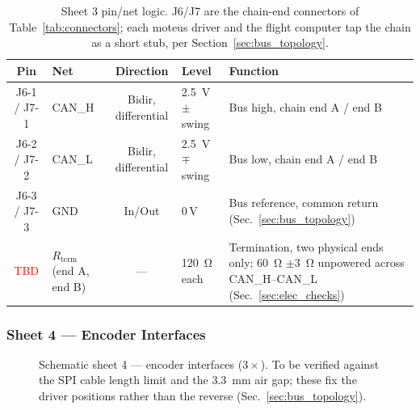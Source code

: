 \begin{table}[htbp]
\centering
\caption[Sheet 3 pin/net logic]{Sheet 3 pin/net logic. J6/J7 are the chain-end connectors of
Table~\ref{tab:connectors}; each moteus driver and the flight computer tap the
chain as a short stub, per Section~\ref{sec:bus_topology}.}
\label{tab:pins_can_bus}
\small
\setlength{\tabcolsep}{4pt}
\begin{tabular}{c L{2.6cm} c L{2.4cm} L{5.4cm}}
\toprule
Pin & Net & Direction & Level & Function \\
\midrule
J6-1 / J7-1 & CAN\_H & Bidir, differential & \qty{2.5}{\volt} $\pm$ swing & Bus high, chain end A / end B \\
J6-2 / J7-2 & CAN\_L & Bidir, differential & \qty{2.5}{\volt} $\mp$ swing & Bus low, chain end A / end B \\
J6-3 / J7-3 & GND & In/Out & 0\,V & Bus reference, common return (Sec.~\ref{sec:bus_topology}) \\
\textcolor{red}{TBD} & $R_{\text{term}}$ (end A, end B) & --- & \qty{120}{\ohm} each & Termination, two physical ends only; \qty{60}{\ohm} $\pm$\qty{3}{\ohm} unpowered across CAN\_H--CAN\_L (Sec.~\ref{sec:elec_checks}) \\
\bottomrule
\end{tabular}
\end{table}

\subsubsection{Sheet 4 --- Encoder Interfaces}
\begin{figure}[htbp]
\centering
{}
\caption[Schematic sheet 4: encoder interfaces]{Schematic sheet 4 --- encoder interfaces ($3\times$). To be verified
against the SPI cable length limit and the \qty{3.3}{\milli\metre} air gap; these
fix the driver positions rather than the reverse
(Sec.~\ref{sec:bus_topology}).}
\label{fig:sch_encoders}
\end{figure}

